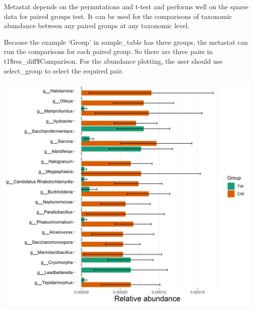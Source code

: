 \documentclass[
]{book}
\newenvironment{Shaded}{\begin{snugshade}}{\end{snugshade}}
\newcommand{\AttributeTok}[1]{\textcolor[rgb]{0.77,0.63,0.00}{#1}}
\newcommand{\CommentTok}[1]{\textcolor[rgb]{0.56,0.35,0.01}{\textit{#1}}}
\newcommand{\DecValTok}[1]{\textcolor[rgb]{0.00,0.00,0.81}{#1}}
\newcommand{\FunctionTok}[1]{\textcolor[rgb]{0.00,0.00,0.00}{#1}}
\newcommand{\NormalTok}[1]{#1}
\newcommand{\OtherTok}[1]{\textcolor[rgb]{0.56,0.35,0.01}{#1}}
\newcommand{\SpecialCharTok}[1]{\textcolor[rgb]{0.00,0.00,0.00}{#1}}
\newcommand{\StringTok}[1]{\textcolor[rgb]{0.31,0.60,0.02}{#1}}
\begin{document}
Metastat depends on the permutations and t-test and performs well on the sparse data for paired groups test.
It can be used for the comparisons of taxonomic abundance between any paired groups at any taxonomic level.

\begin{Shaded}
\end{Shaded}

Because the example `Group' in sample\_table has three groups,
the metastat can run the comparisons for each paired group. So there are three pairs in t1\$res\_diff\$Comparison.
For the abundance plotting, the user should use select\_group to select the required pair.

\begin{Shaded}
\end{Shaded}

\begin{center}\includegraphics[width=650px]{Images/plot_metastat_1} \end{center}
\end{document}
